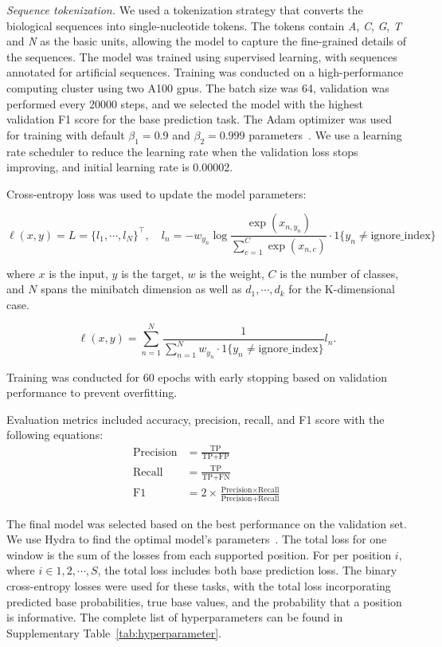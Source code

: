 \documentclass[pdflatex, sn-mathphys-num, lineno]{sn-jnl}%
\theoremstyle{thmstyleone}%
\theoremstyle{thmstyletwo}%
\theoremstyle{thmstylethree}%
\begin{document}
\textit{Sequence tokenization.} We used a tokenization strategy that converts the biological sequences into single-nucleotide tokens.
The tokens contain \emph{A}, \emph{C}, \emph{G}, \emph{T} and \emph{N} as the basic units, allowing the model to capture the fine-grained details of the sequences.
The model was trained using supervised learning, with sequences annotated for artificial sequences.
Training was conducted on a high-performance computing cluster using two A100 \glspl{gpu}.
The batch size was \num{64}, validation was performed every \num{20000} steps, and we selected the model with the highest validation F1 score for the base prediction task.
The Adam optimizer was used for training with default \( \beta_{1} = 0.9 \) and \( \beta_{2} = 0.999 \) parameters~\cite{kingma2014adam}.
We use a learning rate scheduler to reduce the learning rate when the validation loss stops improving, and initial learning rate is \num{0.00002}.

Cross-entropy loss was used to update the model parameters:

\[
	\ell(x, y) = L = \{l_1,\cdots,l_N\}^\top, \quad
	l_n = - w_{y_n} \log \frac{\exp(x_{n,y_n})}{\sum_{c=1}^C \exp(x_{n,c})}
	\cdot 1\{y_n \not= \textrm{ignore\_index}\}
\]

where \( x \) is the input, \( y \) is the target, \( w \) is the weight,
\( C \) is the number of classes, and \( N \) spans the minibatch dimension as well as
\( d_1, \cdots, d_k \) for the K-dimensional case.

\[
	\ell(x, y) =   \sum_{n=1}^N \frac{1}{\sum_{n=1}^N w_{y_n} \cdot 1\{y_n \not= \textrm{ignore\_index}\}} l_n
	.\]

Training was conducted for \num{60} epochs with early stopping based on validation performance to prevent overfitting.

Evaluation metrics included accuracy, precision, recall, and F1 score with the following equations:
\begin{align*}
	\textrm{Precision} & = \frac{\textrm{TP}}{\textrm{TP}+\textrm{FP}}                                                     \\
	\textrm{Recall}    & = \frac{\textrm{TP}}{\textrm{TP}+\textrm{FN}}                                                     \\
	\textrm{F1}        & = 2 \times \frac{\textrm{Precision} \times \textrm{Recall}}{\textrm{Precision} + \textrm{Recall}}
\end{align*}

The final model was selected based on the best performance on the validation set.
We use Hydra to find the optimal model's parameters~\cite{Yadan2019Hydra}.
The total loss for one window is the sum of the losses from each supported position.
For per position  \( i \), where \( i  \in {1,2, \cdots, S} \),  the total loss includes both base prediction loss.
The binary cross-entropy losses were used for these tasks, with the total loss incorporating predicted base probabilities, true base values, and the probability that a position is informative.
The complete list of hyperparameters can be found in Supplementary Table~\ref{tab:hyperparameter}.
\end{document}
